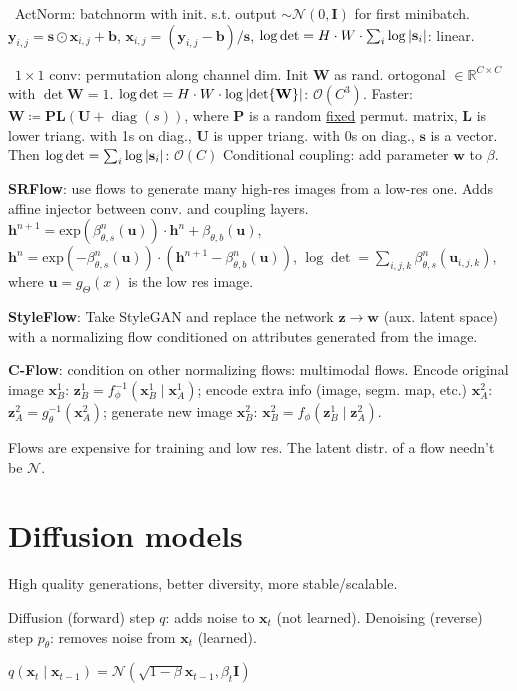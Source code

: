 \documentclass[11pt,landscape,a4paper,fleqn]{article}
\DeclareMathOperator{\diag}{\mathrm{diag}}
\newcommand{\R}{\mathbb{R}}
\renewcommand{\exp}{\mathrm{exp}}
\def\myvector#1{\mathbf{#1}}
\def\vb{{\myvector{b}}}
\def\vh{{\myvector{h}}}
\def\vs{{\myvector{s}}}
\def\vu{{\myvector{u}}}
\def\vw{{\myvector{w}}}
\def\vx{{\myvector{x}}}
\def\vy{{\myvector{y}}}
\def\vz{{\myvector{z}}}
\def\mymatrix#1{\mathbf{#1}}
\def\mI{{\mymatrix{I}}}
\def\mL{{\mymatrix{L}}}
\def\mP{{\mymatrix{P}}}
\def\mU{{\mymatrix{U}}}
\def\mW{{\mymatrix{W}}}
\begin{document}
\begin{multicols*}{4}
\textbullet\ ActNorm: batchnorm with init. s.t. output $\sim \mathcal{N}(0, \mI)$ for first minibatch.
    $\vy_{i,j} = \vs \odot \vx_{i,j} + \vb$,
    $\vx_{i, j} = (\vy_{i,j} - \vb) / \vs$,
    $\log\det = H \cdot W \cdot \sum_i \log \abs{\vs_i}$: linear.

\textbullet\ $1 \times 1$ conv: permutation along channel dim.
    Init $\mW$ as rand. ortogonal $\in \R^{C \times C}$ with $\det\mW = 1$.
    $\log\det = H \cdot W \cdot \log\abs{\det\mW}$: $\mathcal{O}(C^3)$.
    Faster: $\mW \coloneqq \mP \mL(\mU + \diag(s))$,
    where $\mP$ is a random \underline{fixed} permut. matrix,
    $\mL$ is lower triang. with 1s on diag.,
    $\mU$ is upper triang. with 0s on diag.,
    $\vs$ is a vector.
    Then $\log\det = \sum_i \log \abs{\vs_i}$: $\mathcal{O}(C)$
Conditional coupling: add parameter $\vw$ to $\beta$.

\textbf{SRFlow}: use flows to generate many high-res images from a low-res one.
Adds affine injector between conv. and coupling layers.
$\vh^{n+1} = \exp(\beta^n_{\theta, s}(\vu)) \cdot \vh^n + \beta_{\theta, b}(\vu)$,
$\vh^n = \exp( - \beta^n_{\theta, s}(\vu)) \cdot (\vh^{n+1} - \beta^n_{\theta, b}(\vu))$,
$\log\det = \sum_{i,j,k} \beta^n_{\theta, s}(\vu_{i, j, k})$, where $\vu = g_\Theta(x)$ is the low res image.

\textbf{StyleFlow}: Take StyleGAN and replace the network $\vz \to \vw$ (aux. latent space)
with a normalizing flow conditioned on attributes generated from the image.

\textbf{C-Flow}: condition on other normalizing flows: multimodal flows.
Encode original image $\vx_B^1$: $\vz_B^1 = f^{-1}_\phi(\vx_B^1 \mid \vx_A^1)$;
encode extra info (image, segm. map, etc.) $\vx_A^2$: $\vz_A^2 = g^{-1}_\theta(\vx_A^2)$;
generate new image $\vx_B^2$: $\vx_B^2 = f_\phi(\vz_B^1 \mid \vz_A^2)$.

Flows are expensive for training and low res.
The latent distr. of a flow needn't be $\mathcal{N}$.


\section{Diffusion models}

High quality generations, better diversity, more stable/scalable.

Diffusion (forward) step $q$: adds noise to $\vx_t$ (not learned).
Denoising (reverse) step $p_\theta$: removes noise from $\vx_t$ (learned).

$q(\vx_t \mid \vx_{t-1}) = \mathcal{N}(\sqrt{1 - \beta} \vx_{t-1}, \beta_t \mI)$


\end{multicols*}
\end{document}
